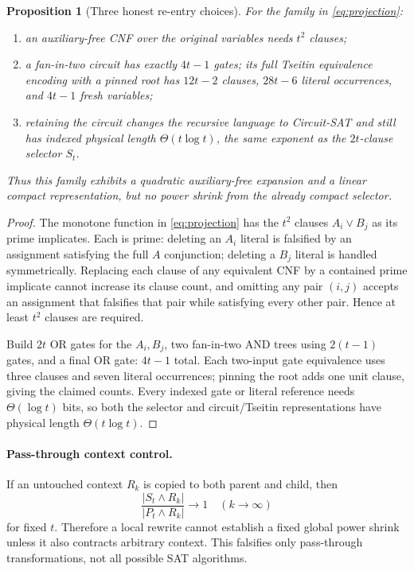 \documentclass[11pt]{article}
\newtheorem{proposition}{Proposition}
\begin{document}
\begin{proposition}[Three honest re-entry choices]
For the family in \eqref{eq:projection}:
\begin{enumerate}
\item an auxiliary-free CNF over the original variables needs $t^2$ clauses;
\item a fan-in-two circuit has exactly $4t-1$ gates; its full Tseitin
      equivalence encoding with a pinned root has $12t-2$ clauses,
      $28t-6$ literal occurrences, and $4t-1$ fresh variables;
\item retaining the circuit changes the recursive language to Circuit-SAT and
      still has indexed physical length $\Theta(t\log t)$, the same exponent as
      the $2t$-clause selector $S_t$.
\end{enumerate}
Thus this family exhibits a quadratic auxiliary-free expansion and a linear
compact representation, but no power shrink from the already compact selector.
\end{proposition}
\begin{proof}
The monotone function in \eqref{eq:projection} has the $t^2$ clauses
$A_i\vee B_j$ as its prime implicates.  Each is prime: deleting an $A_i$
literal is falsified by an assignment satisfying the full $A$ conjunction;
deleting a $B_j$ literal is handled symmetrically.  Replacing each clause of
any equivalent CNF by a contained prime implicate cannot increase its clause
count, and omitting any pair $(i,j)$ accepts an assignment that falsifies that
pair while satisfying every other pair.  Hence at least $t^2$ clauses are
required.

Build $2t$ OR gates for the $A_i,B_j$, two fan-in-two AND trees using
$2(t-1)$ gates, and a final OR gate: $4t-1$ total.  Each two-input gate
equivalence uses three clauses and seven literal occurrences; pinning the root
adds one unit clause, giving the claimed counts.  Every indexed gate or literal
reference needs $\Theta(\log t)$ bits, so both the selector and circuit/Tseitin
representations have physical length $\Theta(t\log t)$.
\end{proof}

\paragraph{Pass-through context control.}
If an untouched context $R_k$ is copied to both parent and child, then
\[
 \frac{|S_t\wedge R_k|}{|P_t\wedge R_k|}\longrightarrow 1
 \quad(k\to\infty)
\]
for fixed $t$.  Therefore a local rewrite cannot establish a fixed global
power shrink unless it also contracts arbitrary context.  This falsifies only
pass-through transformations, not all possible SAT algorithms.
\end{document}
